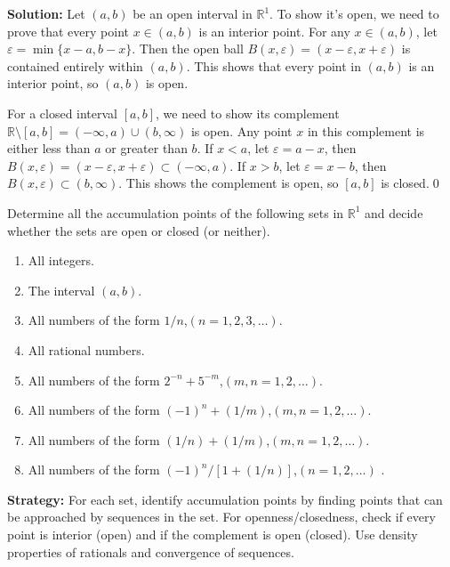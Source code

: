 \bigskip\noindent\textbf{Solution:} Let $(a,b)$ be an open interval in $\mathbb{R}^1$. To show it's open, we need to prove that every point $x \in (a,b)$ is an interior point. For any $x \in (a,b)$, let $\varepsilon = \min\{x-a, b-x\}$. Then the open ball $B(x,\varepsilon) = (x-\varepsilon, x+\varepsilon)$ is contained entirely within $(a,b)$. This shows that every point in $(a,b)$ is an interior point, so $(a,b)$ is open.

For a closed interval $[a,b]$, we need to show its complement $\mathbb{R} \setminus [a,b] = (-\infty,a) \cup (b,\infty)$ is open. Any point $x$ in this complement is either less than $a$ or greater than $b$. If $x < a$, let $\varepsilon = a-x$, then $B(x,\varepsilon) = (x-\varepsilon, x+\varepsilon) \subset (-\infty,a)$. If $x > b$, let $\varepsilon = x-b$, then $B(x,\varepsilon) \subset (b,\infty)$. This shows the complement is open, so $[a,b]$ is closed.\qed


\begin{problembox}
Determine all the accumulation points of the following sets in $\mathbb{R}^1$ and decide whether the sets are open or closed (or neither).
\begin{enumerate}[label=\textbf{(\alph*)}]
\item All integers.
\item The interval $(a, b)$.
\item All numbers of the form $1/n$,\quad $(n = 1, 2, 3, \dots)$.
\item All rational numbers.
\item All numbers of the form $2^{-n} + 5^{-m}$,\quad $(m, n = 1, 2, \dots)$.
\item All numbers of the form $(-1)^n + (1/m)$,\quad $(m, n = 1, 2, \dots)$.
\item All numbers of the form $(1/n) + (1/m)$,\quad $(m, n = 1, 2, \dots)$.
\item All numbers of the form $(-1)^n / [1 + (1/n)]$,\quad $(n = 1, 2, \dots)$
.
\end{enumerate}
\end{problembox}

\noindent\textbf{Strategy:} For each set, identify accumulation points by finding points that can be approached by sequences in the set. For openness/closedness, check if every point is interior (open) and if the complement is open (closed). Use density properties of rationals and convergence of sequences.

